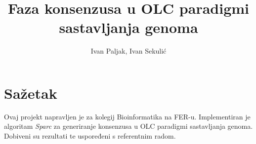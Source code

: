 \documentclass[times, utf8, seminar]{fer}
\begin{document}
\title{Faza konsenzusa u OLC paradigmi sastavljanja genoma}

\author{Ivan Paljak, Ivan Sekulić}


\maketitle

\tableofcontents















\chapter{Sažetak}
Ovaj projekt napravljen je za kolegij Bioinformatika na FER-u.
Implementiran je algoritam \emph{Sparc} za generiranje konsenzusa u OLC paradigmi sastavljanja genoma.
Dobiveni su rezultati te uspoređeni s referentnim radom.
\end{document}
